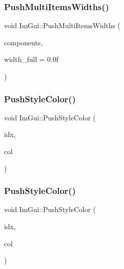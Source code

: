 \hypertarget{namespace_im_gui_ab913605fcf6d405d102cdf56cd414a5a}{}\label{namespace_im_gui_ab913605fcf6d405d102cdf56cd414a5a} 
\subsubsection{\texorpdfstring{Push\+Multi\+Items\+Widths()}{PushMultiItemsWidths()}}
{\footnotesize\ttfamily void Im\+Gui\+::\+Push\+Multi\+Items\+Widths (\begin{DoxyParamCaption}\item[{int}]{components,  }\item[{float}]{width\+\_\+full = {\ttfamily 0.0f} }\end{DoxyParamCaption})}

\hypertarget{namespace_im_gui_a77ee84afb636e05eb4b2d6eeddcc2aa8}{}\label{namespace_im_gui_a77ee84afb636e05eb4b2d6eeddcc2aa8} 
\subsubsection{\texorpdfstring{Push\+Style\+Color()}{PushStyleColor()}\hspace{0.1cm}{\footnotesize\ttfamily [1/2]}}
{\footnotesize\ttfamily void Im\+Gui\+::\+Push\+Style\+Color (\begin{DoxyParamCaption}\item[{Im\+Gui\+Col}]{idx,  }\item[{Im\+U32}]{col }\end{DoxyParamCaption})}

\hypertarget{namespace_im_gui_a5bd052ebf55015312a53739974950e7b}{}\label{namespace_im_gui_a5bd052ebf55015312a53739974950e7b} 
\subsubsection{\texorpdfstring{Push\+Style\+Color()}{PushStyleColor()}\hspace{0.1cm}{\footnotesize\ttfamily [2/2]}}
{\footnotesize\ttfamily void Im\+Gui\+::\+Push\+Style\+Color (\begin{DoxyParamCaption}\item[{Im\+Gui\+Col}]{idx,  }\item[{const \hyperlink{struct_im_vec4}{Im\+Vec4} \&}]{col }\end{DoxyParamCaption})}

